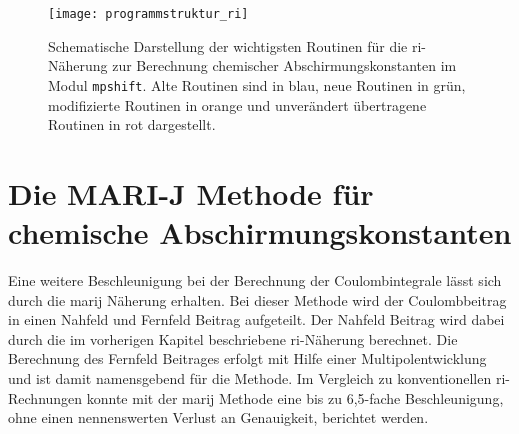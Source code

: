 \begin{figure}[ht!]
\centering
\texttt{[image: programmstruktur\_ri]}
\captionsetup{figurewithin = chapter}
\captionsetup{font=small, labelfont=bf}\caption[\ac{ri}-J Routinen für chemische Abschirmungskonstanten]{Schematische Darstellung der wichtigsten Routinen für die \ac{ri}-Näherung zur Berechnung chemischer Abschirmungskonstanten im Modul \texttt{mpshift}. Alte Routinen sind in blau, neue Routinen in grün, modifizierte Routinen in orange und unverändert übertragene Routinen in rot dargestellt.}
\label{abb:programmstrukur_ri}
\end{figure}

\section{Die MARI-J Methode für chemische Abschirmungskonstanten}\label{marij}
Eine weitere Beschleunigung bei der Berechnung der Coulombintegrale lässt sich durch die \acf{marij} Näherung erhalten. Bei dieser Methode wird der Coulombbeitrag in einen Nahfeld und Fernfeld Beitrag aufgeteilt. Der Nahfeld Beitrag wird dabei durch die im vorherigen Kapitel beschriebene \ac{ri}-Näherung berechnet. Die Berechnung des Fernfeld Beitrages erfolgt mit Hilfe einer Multipolentwicklung und ist damit namensgebend für die Methode. Im Vergleich zu konventionellen \ac{ri}-Rechnungen konnte mit der \ac{marij} Methode eine bis zu 6,5-fache Beschleunigung, ohne einen nennenswerten Verlust an Genauigkeit, berichtet werden.\supercite{sierka2003fast}
